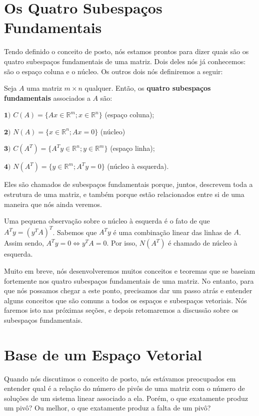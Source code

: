 \section{Os Quatro Subespaços Fundamentais}

Tendo definido o conceito de posto, nós estamos prontos para dizer quais são os quatro subespaços fundamentais de uma matriz. Dois deles nós já conhecemos: são o espaço coluna e o núcleo. Os outros dois nós definiremos a seguir:

\begin{Definition}
	Seja $A$ uma matriz $m\times n$ qualquer. Então, os \textbf{quatro subespaços fundamentais} associados a $A$ são:
	
	$\mathbf{1)}$ $C(A) = \{Ax\in\mathbb{R}^m; x\in\mathbb{R}^n\}$ (espaço coluna);
	
	$\mathbf{2)}$ $N(A) = \{x\in\mathbb{R}^n; Ax = 0\}$ (núcleo)
	
	$\mathbf{3)}$ $C(A^T) = \{A^Ty\in\mathbb{R}^n; y\in\mathbb{R}^m\}$ (espaço linha);
	
	$\mathbf{4)}$ $N(A^T) = \{y\in\mathbb{R}^m; A^Ty = 0\}$ (núcleo à esquerda).
\end{Definition}

Eles são chamados de subespaços fundamentais porque, juntos, descrevem toda a estrutura de uma matriz, e também porque estão relacionados entre si de uma maneira que nós ainda veremos.

Uma pequena observação sobre o núcleo à esquerda é o fato de que $A^Ty = (y^TA)^T$. Sabemos que $A^Ty$ é uma combinação linear das linhas de $A$. Assim sendo, $A^Ty = 0 \iff y^TA = 0$. Por isso, $N(A^T)$ é chamado de núcleo à esquerda.

Muito em breve, nós desenvolveremos muitos conceitos e teoremas que se baseiam fortemente nos quatro subespaços fundamentais de uma matriz. No entanto, para que nós possamos chegar a este ponto, precisamos dar um passo atrás e entender alguns conceitos que são comuns a todos os espaços e subespaços vetoriais. Nós faremos isto nas próximas seções, e depois retomaremos a discussão sobre os subespaços fundamentais.

\section{Base de um Espaço Vetorial}

Quando nós discutimos o conceito de posto, nós estávamos preocupados em entender qual é a relação do número de pivôs de uma matriz com o número de soluções de um sistema linear associado a ela. Porém, o que exatamente produz um pivô? Ou melhor, o que exatamente produz a falta de um pivô?

